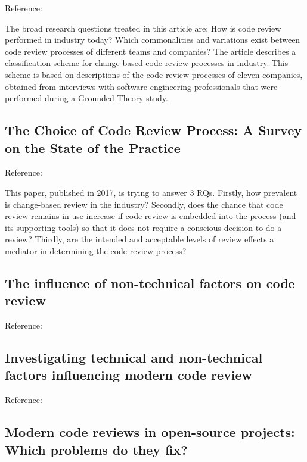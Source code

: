 \documentclass[]{book}
\begin{document}
Reference: \citet{baum2016faceted}

The broad research questions treated in this article are: How is code
review performed in industry today? Which commonalities and variations
exist between code review processes of different teams and companies?
The article describes a classification scheme for change-based code
review processes in industry. This scheme is based on descriptions of
the code review processes of eleven companies, obtained from interviews
with software engineering professionals that were performed during a
Grounded Theory study.

\subsection{The Choice of Code Review Process: A Survey on the State of
the
Practice}\label{the-choice-of-code-review-process-a-survey-on-the-state-of-the-practice}

Reference: \citet{baum2017choice}

This paper, published in 2017, is trying to answer 3 RQs. Firstly, how
prevalent is change-based review in the industry? Secondly, does the
chance that code review remains in use increase if code review is
embedded into the process (and its supporting tools) so that it does not
require a conscious decision to do a review? Thirdly, are the intended
and acceptable levels of review effects a mediator in determining the
code review process?

\subsection{The influence of non-technical factors on code
review}\label{the-influence-of-non-technical-factors-on-code-review}

Reference: \citet{baysal2013influence}

\subsection{Investigating technical and non-technical factors
influencing modern code
review}\label{investigating-technical-and-non-technical-factors-influencing-modern-code-review}

Reference: \citet{baysal2016investigating}

\subsection{Modern code reviews in open-source projects: Which problems
do they
fix?}\label{modern-code-reviews-in-open-source-projects-which-problems-do-they-fix}
\end{document}
